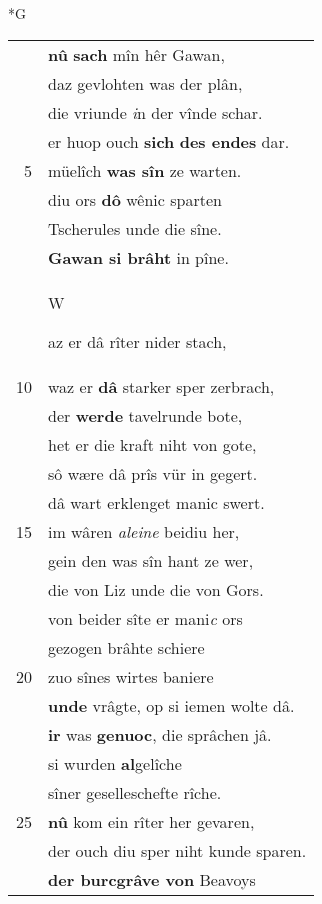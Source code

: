 \documentclass[8pt,a4paper,notitlepage]{article}
\begin{document}
\newpage
\begin{table}[ht]
\begin{minipage}[t]{0.5\linewidth}
\small
\begin{center}*G
\end{center}
\begin{tabular}{rl}
 & \textbf{nû} \textbf{sach} mîn hêr Gawan,\\ 
 & daz gevlohten was der plân,\\ 
 & die vriunde \textit{i}n der vînde schar.\\ 
 & er huop ouch \textbf{sich} \textbf{des endes} dar.\\ 
5 & müelîch \textbf{was sîn} ze warten.\\ 
 & diu ors \textbf{dô} wênic sparten\\ 
 & Tscherules unde die sîne.\\ 
 & \textbf{Gawan si brâht} in pîne.\\ 
 & \begin{large}W\end{large}az er dâ rîter nider stach,\\ 
10 & waz er \textbf{dâ} starker sper zerbrach,\\ 
 & der \textbf{werde} tavelrunde bote,\\ 
 & het er die kraft niht von gote,\\ 
 & sô wære dâ prîs vür in gegert.\\ 
 & dâ wart erklenget manic swert.\\ 
15 & im wâren \textit{aleine} beidiu her,\\ 
 & gein den was sîn hant ze wer,\\ 
 & die von Liz unde die von Gors.\\ 
 & von beider sîte er mani\textit{c} ors\\ 
 & gezogen brâhte schiere\\ 
20 & zuo sînes wirtes baniere\\ 
 & \textbf{unde} vrâgte, op si iemen wolte dâ.\\ 
 & \textbf{ir} was \textbf{genuoc}, die sprâchen jâ.\\ 
 & si wurden \textbf{al}gelîche\\ 
 & sîner geselleschefte rîche.\\ 
25 & \textbf{nû} kom ein rîter her gevaren,\\ 
 & der ouch diu sper niht kunde sparen.\\ 
 & \textbf{der burcgrâve von} Beavoys\\ 

\end{tabular}
\end{minipage}
\end{table}
\end{document}
